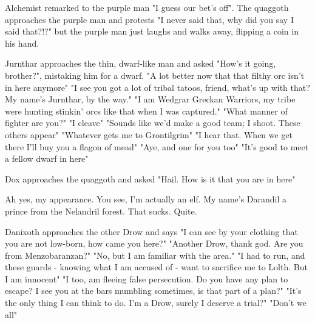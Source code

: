 \documentclass[letterpaper,10pt,twoside,twocolumn,openany]{book}
\begin{document}
Alchemist remarked to the purple man "I guess our bet's off". The quaggoth approaches the purple man and protests "I never said that, why did you say I said that?!?" but the purple man just laughs and walks away, flipping a coin in his hand.

Jurnthar approaches the thin, dwarf-like man and asked "How's it going, brother?", mistaking him for a dwarf. "A lot better now that that filthy orc isn't in here anymore"
"I see you got a lot of tribal tatoos, friend, what's up with that? My name's Jurnthar, by the way."
"I am Wedgrar Greckan Warriors, my tribe were hunting stinkin' orcs like that when I was captured."
"What manner of fighter are you?"
"I cleave"
"Sounds like we'd make a good team; I shoot. These others appear"
"Whatever gets me to Grontilgrim"
"I hear that. When we get there I'll buy you a flagon of mead"
"Aye, and one for you too"
"It's good to meet a fellow dwarf in here"

Dox approaches the quaggoth and asked "Hail. How is it that you are in here"

Ah yes, my appearance. You see, I'm actually an elf. My name's Darandil a prince from the Nelandril forest.
That sucks.
Quite.

Danixoth approaches the other Drow and says "I can see by your clothing that you are not low-born, how came you here?"
"Another Drow, thank god. Are you from Menzobaranzan?"
"No, but I am familiar with the area."
"I had to run, and these guards - knowing what I am accused of - want to sacrifice me to Lolth. But I am innocent"
"I too, am fleeing false persecution. Do you have any plan to escape? I see you at the bars mumbling sometimes, is that part of a plan?"
"It's the only thing I can think to do. I'm a Drow, surely I deserve a trial?"
"Don't we all"
\end{document}
